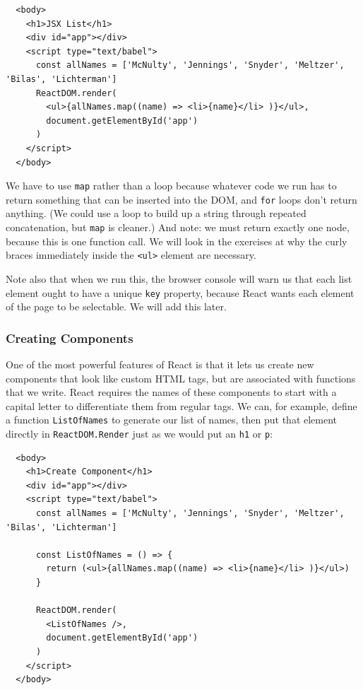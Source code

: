 \begin{verbatim}
  <body>
    <h1>JSX List</h1>
    <div id="app"></div>
    <script type="text/babel">
      const allNames = ['McNulty', 'Jennings', 'Snyder', 'Meltzer', 'Bilas', 'Lichterman']
      ReactDOM.render(
        <ul>{allNames.map((name) => <li>{name}</li> )}</ul>,
        document.getElementById('app')
      )
    </script>
  </body>
\end{verbatim}

We have to use \texttt{map} rather than a loop because whatever code we
run has to return something that can be inserted into the DOM, and
\texttt{for} loops don't return anything. (We could use a loop to build
up a string through repeated concatenation, but \texttt{map} is
cleaner.) And note: we must return exactly one node, because this is one
function call. We will look in the exercises at why the curly braces
immediately inside the \texttt{\textless{}ul\textgreater{}} element are
necessary.

Note also that when we run this, the browser console will warn us that
each list element ought to have a unique \texttt{key} property, because
React wants each element of the page to be selectable. We will add this
later.

\subsubsection{Creating Components}\label{s:dynamic-components}

One of the most powerful features of React is that it lets us create new
components that look like custom HTML tags, but are associated with
functions that we write. React requires the names of these components to
start with a capital letter to differentiate them from regular tags. We
can, for example, define a function \texttt{ListOfNames} to generate our
list of names, then put that element directly in
\texttt{ReactDOM.Render} just as we would put an \texttt{h1} or
\texttt{p}:

\begin{verbatim}
  <body>
    <h1>Create Component</h1>
    <div id="app"></div>
    <script type="text/babel">
      const allNames = ['McNulty', 'Jennings', 'Snyder', 'Meltzer', 'Bilas', 'Lichterman']

      const ListOfNames = () => {
        return (<ul>{allNames.map((name) => <li>{name}</li> )}</ul>)
      }

      ReactDOM.render(
        <ListOfNames />,
        document.getElementById('app')
      )
    </script>
  </body>
\end{verbatim}

